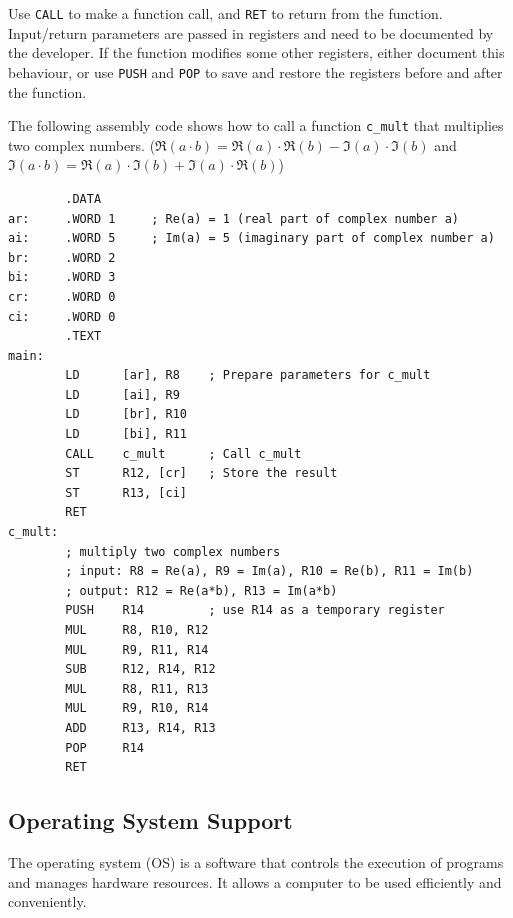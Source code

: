 \begin{enumerate}
Use \texttt{CALL} to make a function call, and \texttt{RET} to return from the function.
Input/return parameters are passed in registers and need to be documented by the developer.
If the function modifies some other registers, either document this behaviour, or use
\texttt{PUSH} and \texttt{POP} to save and restore the registers before and after the
function.
\begin{example}
    The following assembly code shows how to call a function \texttt{c\_mult} that
    multiplies two complex numbers.
    ($\Re(a\cdot b) = \Re(a)\cdot\Re(b) - \Im(a)\cdot\Im(b)$ and
    $\Im(a\cdot b) = \Re(a)\cdot\Im(b) + \Im(a)\cdot\Re(b)$)
\begin{verbatim}
        .DATA
ar:     .WORD 1     ; Re(a) = 1 (real part of complex number a)
ai:     .WORD 5     ; Im(a) = 5 (imaginary part of complex number a)
br:     .WORD 2
bi:     .WORD 3
cr:     .WORD 0
ci:     .WORD 0
        .TEXT
main:
        LD      [ar], R8    ; Prepare parameters for c_mult
        LD      [ai], R9
        LD      [br], R10
        LD      [bi], R11
        CALL    c_mult      ; Call c_mult
        ST      R12, [cr]   ; Store the result
        ST      R13, [ci]
        RET
c_mult: 
        ; multiply two complex numbers
        ; input: R8 = Re(a), R9 = Im(a), R10 = Re(b), R11 = Im(b)
        ; output: R12 = Re(a*b), R13 = Im(a*b)
        PUSH    R14         ; use R14 as a temporary register
        MUL     R8, R10, R12
        MUL     R9, R11, R14
        SUB     R12, R14, R12
        MUL     R8, R11, R13
        MUL     R9, R10, R14
        ADD     R13, R14, R13
        POP     R14
        RET
\end{verbatim}
\end{example}

\end{enumerate}

\subsection{Operating System Support}

The operating system (OS) is a software that controls the execution of programs and
manages hardware resources. It allows a computer to be used efficiently and conveniently.

